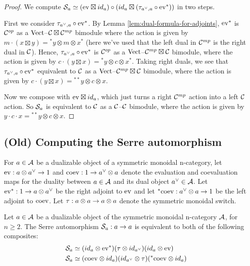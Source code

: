 \documentclass{amsart}
\begin{document}
\begin{proof}
We compute $\mathcal S_a \simeq (\mathrm{ev} \boxtimes {id}_a) \circ ({id}_a \boxtimes (\tau_{a^\vee,a} \circ  \mathrm{ev}^*))$ in two steps.  

First we consider $\tau_{a^\vee,a} \circ  \mathrm{ev}^*$.  By Lemma \ref{lem:dual-formula-for-adjoints}, $\mathrm{ev}^*$ is $\mathcal C^{{op}}$ as a $\mathrm{Vect}$--${\mathcal C \boxtimes \mathcal C^{{mp}}}$ bimodule where the action is given by $m\cdot (x \boxtimes y) = {}^*y \otimes m \otimes x^*$ (here we've used that the left dual in $\mathcal C^{{mp}}$ is the right dual in $\mathcal C$).  Hence, $\tau_{a^\vee,a} \circ  \mathrm{ev}^*$ is $\mathcal C^{op}$ as a $\mathrm{Vect}$--$\mathcal C^{mp} \boxtimes \mathcal C$ bimodule, where the action is given by $c \cdot (y \boxtimes x) =  {}^*y \otimes c \otimes x^*$.  Taking right duals, we see that $\tau_{a^\vee,a} \circ  \mathrm{ev}^*$ equivalent to $\mathcal C$ as a $\mathrm{Vect}$--$\mathcal C^{mp} \boxtimes \mathcal C$ bimodule, where the action is given by $c \cdot (y \boxtimes x) =  {}^{**}y \otimes c \otimes x$.

Now we compose with $\mathrm{ev} \boxtimes {id}_a$, which just turns a right $\mathcal C^{{mp}}$ action into a left $\mathcal C$ action.  So $\mathcal S_a$ is equivalent to $\mathcal C$ as a  $\mathcal C$--$\mathcal C$ bimodule, where the action is given by $y \cdot c \cdot x=  {}^{**}y \otimes c \otimes x$.
\end{proof}



\subsection{(Old) Computing the Serre automorphism} \label{sec-serre-comp}


For $a \in \mathcal A$ be a dualizable object of a symmetric monoidal n-category, let $\mathrm{ev} : a \otimes a^{\vee} \rightarrow 1$ and $\mathrm{coev}: 1 \rightarrow a^{\vee} \otimes a$ denote the evaluation and coevaluation maps for the duality between $a \in \mathcal A$ and its dual object $a^{\vee} \in \mathcal A$.  Let ${\mathrm{ev}}^*: 1 \rightarrow a \otimes a^{\vee}$ be the right adjoint to $\mathrm{ev}$ and let ${}^*{\mathrm{coev}}: a^{\vee} \otimes a \rightarrow 1$ be the left adjoint to $\mathrm{coev}$.  Let $\tau: a \otimes a \rightarrow a \otimes a$ denote the symmetric monoidal switch.

\begin{proposition} \label{prop-serrecomp}
Let $a \in \mathcal A$ be a dualizable object of the symmetric monoidal n-category $\mathcal A$, for $n \geq 2$.  The Serre automorphism $\mathcal S_a : a \rightarrow a$ is equivalent to both of the following composites:
\begin{align}
\mathcal S_a & \simeq ({id}_a \otimes {\mathrm{ev}}^*) (\tau \otimes {id}_{a^{\vee}}) ({id}_a \otimes \mathrm{ev}) \nonumber\\
\mathcal S_a & \simeq (\mathrm{coev} \otimes {id}_a) ({id}_{a^{\vee}} \otimes \tau) ({}^*{\mathrm{coev}} \otimes {id}_a) \nonumber
\end{align}
\end{proposition}
\end{document}

